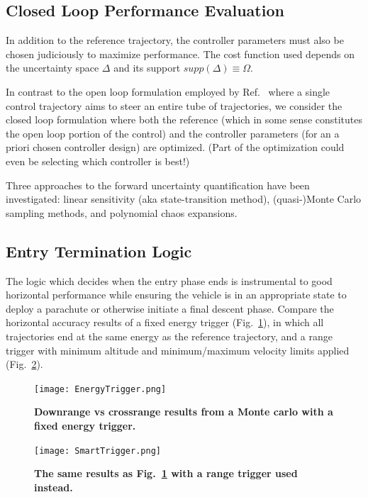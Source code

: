 \documentclass[10pt,a4paper]{article}
\begin{document}
	\subsection{Closed Loop Performance Evaluation}		
	In addition to the reference trajectory, the controller parameters must also be chosen judiciously to maximize performance. The cost function used depends on the uncertainty space $ \Delta $ and its support $supp(\Delta)\equiv\Omega$.		
			
	In contrast to the open loop formulation employed by Ref.~\cite{RSOptimalControl} where a single control trajectory aims to steer an entire tube of trajectories, we consider the closed loop formulation where both the reference (which in some sense constitutes the open loop portion of the control) and the controller parameters (for an a priori chosen controller design) are optimized. (Part of the optimization could even be selecting which controller is best!)		
	
	Three approaches to the forward uncertainty quantification have been investigated: linear sensitivity (aka state-transition method), (quasi-)Monte Carlo sampling methods, and polynomial chaos expansions.  
			
	\subsection{Entry Termination Logic}
	The logic which decides when the entry phase ends is instrumental to good horizontal performance while ensuring the vehicle is in an appropriate state to deploy a parachute or otherwise initiate a final descent phase. Compare the horizontal accuracy results of a fixed energy trigger (Fig.~\ref{EnergyTrigger}), in which all trajectories end at the same energy as the reference trajectory, and a range trigger with minimum altitude and minimum/maximum velocity limits applied (Fig.~\ref{RangeTrigger}). 
	
		\begin{figure}
			\centering
			\texttt{[image: EnergyTrigger.png]}
			\caption{\bf{Downrange vs crossrange results from a Monte carlo with a fixed energy trigger.}}
			\label{EnergyTrigger}
		\end{figure}
		\begin{figure}
			\centering
			\texttt{[image: SmartTrigger.png]}
			\caption{\bf{The same results as Fig.~\ref{EnergyTrigger} with a range trigger used instead. }}
			\label{RangeTrigger}
		\end{figure}
	
\end{document}
